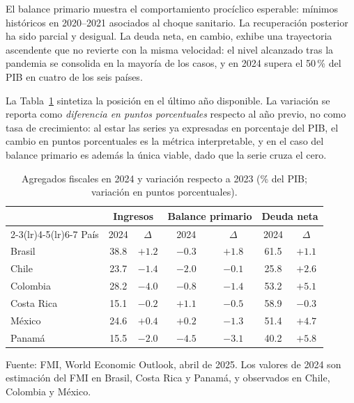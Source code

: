 \documentclass[12pt, letterpaper]{article}
\begin{document}
El balance primario muestra el comportamiento procíclico esperable: mínimos históricos en 2020--2021 asociados al choque sanitario. La recuperación
posterior ha sido parcial y desigual. La deuda neta, en cambio, exhibe una trayectoria
ascendente que no revierte con la misma velocidad: el nivel alcanzado tras la pandemia
se consolida en la mayoría de los casos, y en 2024 supera el 50\,\% del PIB en cuatro de
los seis países.

La Tabla~\ref{tab:ultimo-weo} sintetiza la posición en el último año disponible. La variación se reporta como \emph{diferencia en puntos porcentuales} respecto al año previo, no como tasa de crecimiento: al estar las series ya expresadas en porcentaje del
PIB, el cambio en puntos porcentuales es la métrica interpretable, y en el caso del balance primario es además la única viable, dado que la serie cruza el cero.

\begin{table}[htbp]
  \centering
  \caption{Agregados fiscales en 2024 y variación respecto a 2023
  (\% del PIB; variación en puntos porcentuales).}
  \label{tab:ultimo-weo}
  \begin{tabular}{lcccccc}
    \toprule
    & \multicolumn{2}{c}{Ingresos} & \multicolumn{2}{c}{Balance primario}
    & \multicolumn{2}{c}{Deuda neta} \\
    \cmidrule(lr){2-3}\cmidrule(lr){4-5}\cmidrule(lr){6-7}
    País & 2024 & $\Delta$ & 2024 & $\Delta$ & 2024 & $\Delta$ \\
    \midrule
    Brasil     & 38.8 & $+1.2$ & $-0.3$ & $+1.8$ & 61.5 & $+1.1$ \\
    Chile      & 23.7 & $-1.4$ & $-2.0$ & $-0.1$ & 25.8 & $+2.6$ \\
    Colombia   & 28.2 & $-4.0$ & $-0.8$ & $-1.4$ & 53.2 & $+5.1$ \\
    Costa Rica & 15.1 & $-0.2$ & $+1.1$ & $-0.5$ & 58.9 & $-0.3$ \\
    México     & 24.6 & $+0.4$ & $+0.2$ & $-1.3$ & 51.4 & $+4.7$ \\
    Panamá     & 15.5 & $-2.0$ & $-4.5$ & $-3.1$ & 40.2 & $+5.8$ \\
    \bottomrule
  \end{tabular}

  \vspace{2pt}
  \footnotesize
  Fuente: FMI, World Economic Outlook, abril de 2025. Los valores de 2024 son
  estimación del FMI en Brasil, Costa Rica y Panamá, y observados en Chile, Colombia
  y México.
\end{table}
\end{document}
